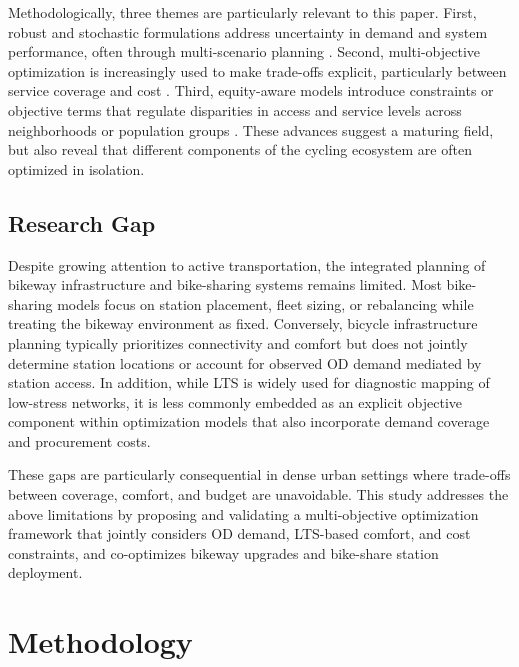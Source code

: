 \documentclass[preprint,authoryear,10pt]{elsarticle}
\begin{document}
Methodologically, three themes are particularly relevant to this paper. First, robust and stochastic formulations address uncertainty in demand and system performance, often through multi-scenario planning \citep{jin2020Robustbikesharingstations, yan2017Rentalbikelocation}. Second, multi-objective optimization is increasingly used to make trade-offs explicit, particularly between service coverage and cost \citep{vishkaei2021Biobjectiveoptimizationcustomers, fan2024Takingmultimodalapproach}. Third, equity-aware models introduce constraints or objective terms that regulate disparities in access and service levels across neighborhoods or population groups \citep{caggiani2020approachmodelingbikesharing, duran-rodas2021DemandEquityDARE, behbahani2019conceptualframeworkformulate}. These advances suggest a maturing field, but also reveal that different components of the cycling ecosystem are often optimized in isolation.

\subsection{Research Gap}

Despite growing attention to active transportation, the integrated planning of bikeway infrastructure and bike-sharing systems remains limited. Most bike-sharing models focus on station placement, fleet sizing, or rebalancing while treating the bikeway environment as fixed. Conversely, bicycle infrastructure planning typically prioritizes connectivity and comfort but does not jointly determine station locations or account for observed OD demand mediated by station access. In addition, while LTS is widely used for diagnostic mapping of low-stress networks, it is less commonly embedded as an explicit objective component within optimization models that also incorporate demand coverage and procurement costs.

These gaps are particularly consequential in dense urban settings where trade-offs between coverage, comfort, and budget are unavoidable. This study addresses the above limitations by proposing and validating a multi-objective optimization framework that jointly considers OD demand, LTS-based comfort, and cost constraints, and co-optimizes bikeway upgrades and bike-share station deployment.




\section{Methodology}\label{method}
\end{document}

